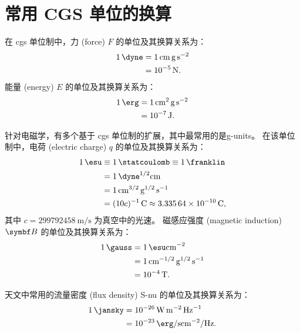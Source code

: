 
\chapter{常用 CGS 单位的换算}
\label{app:units}

在 \ac{cgs} 单位制中，力 (force) $F$ 的单位及其换算关系为：
\begin{align}
  \label{eq:cgs-force}
  \SI{1}{\dyne}
    & = \SI{1}{\cm \gram \second\tothe{-2}} \\
    & = \SI{e-5}{\newton} .
\end{align}
能量 (energy) $E$ 的单位及其换算关系为：
\begin{align}
  \label{eq:cgs-work}
  \SI{1}{\erg}
    & = \SI{1}{\cm\tothe{2} \gram \second\tothe{-2}} \\
    & = \SI{e-7}{\joule} .
\end{align}

针对电磁学，有多个基于 \ac{cgs} 单位制的扩展，其中最常用的是\ac{g-units}。
在该单位制中，电荷 (electric charge) $q$ 的单位及其换算关系为：
\begin{align}
  \label{eq:gu-electrical-charge}
  \SI{1}{\esu}
    & \equiv \SI{1}{\statcoulomb} \equiv \SI{1}{\franklin} \\
    & = \SI{1}{\dyne\tothe{1/2} \cm} \\
    & = \SI{1}{\cm\tothe{3/2} \gram\tothe{1/2} \per\second} \\
    & = (10 c)^{-1}\,\si{\coulomb} \approx \SI{3.33564e-10}{\coulomb} ,
\end{align}
其中 $c = \SI{299792458}{\meter\per\second} $ 为真空中的光速。
磁感应强度 (magnetic induction) $\B{B}$ 的单位及其换算关系为：
\begin{align}
  \label{eq:gu-b-field}
  \SI{1}{\gauss}
    & = \SI{1}{\esu \cm\tothe{-2}} \\
    & = \SI{1}{\cm\tothe{-1/2} \gram\tothe{1/2} \per\second} \\
    & = \SI{e-4}{\tesla} .
\end{align}

天文中常用的流量密度 (flux density) \acs{S-nu} 的单位及其换算关系为：
\begin{align}
  \label{eq:jy-conv}
  \SI{1}{\jansky}
    & = \SI{e-26}{\watt \meter\tothe{-2} \per\hertz} \\
    & = \SI{e-23}{\erg \per\second \cm\tothe{-2} \per\hertz} .
\end{align}



